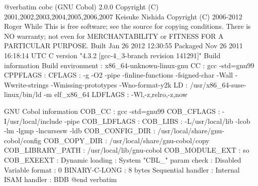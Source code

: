 @verbatim
cobc (GNU Cobol) 2.0.0
Copyright (C) 2001,2002,2003,2004,2005,2006,2007 Keisuke Nishida
Copyright (C) 2006-2012 Roger While
This is free software; see the source for copying conditions.  There is NO
warranty; not even for MERCHANTABILITY or FITNESS FOR A PARTICULAR PURPOSE.
Built     Jan 26 2012 12:30:55
Packaged  Nov 26 2011 16:18:14 UTC
C version "4.3.2 [gcc-4_3-branch revision 141291]"
Build information
Build environment        : x86_64-unknown-linux-gnu
CC                       : gcc -std=gnu99
CPPFLAGS                 : 
CFLAGS                   : -g -O2 -pipe -finline-functions -fsigned-char
                           -Wall -Wwrite-strings -Wmissing-prototypes
                           -Wno-format-y2k
LD                       : /usr/x86_64-suse-linux/bin/ld -m elf_x86_64
LDFLAGS                  : -Wl,-z,relro,-z,now

GNU Cobol information
COB_CC                   : gcc -std=gnu99
COB_CFLAGS               : -I/usr/local/include -pipe
COB_LDFLAGS              : 
COB_LIBS                 : -L/usr/local/lib -lcob -lm -lgmp -lncursesw
                           -ldb
COB_CONFIG_DIR           : /usr/local/share/gnu-cobol/config
COB_COPY_DIR             : /usr/local/share/gnu-cobol/copy
COB_LIBRARY_PATH         : /usr/local/lib/gnu-cobol
COB_MODULE_EXT           : so
COB_EXEEXT               : 
Dynamic loading          : System
"CBL_" param check       : Disabled
Variable format          : 0
BINARY-C-LONG            : 8 bytes
Sequential handler       : Internal
ISAM handler             : BDB
@end verbatim

